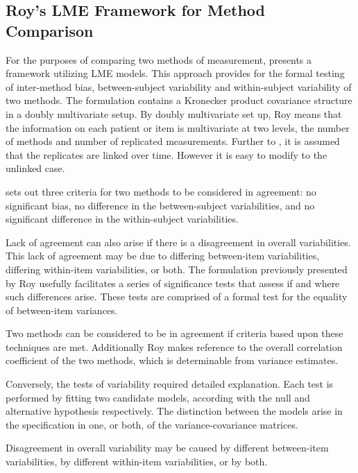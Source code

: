 \documentclass[12pt, a4paper]{report}
\theoremstyle{plain}
\theoremstyle{definition}
\theoremstyle{remark}
\begin{document}
\subsection*{Roy's LME Framework for Method Comparison }
For the purposes of comparing two methods of measurement, \citet{ARoy2009} presents a framework utilizing LME models. This approach provides for the formal testing of inter-method bias, between-subject variability and within-subject variability of two methods. The formulation contains a Kronecker product covariance structure in a doubly multivariate setup. By doubly multivariate set up, Roy means that the information on each patient or item is multivariate at two levels, the number of methods and number of replicated measurements. Further to \citet{lam}, it is assumed that the replicates are linked over time. However it is easy to modify to the unlinked case.

\citet{Barnhart} sets out three criteria for two methods to be considered in agreement: no significant bias, no difference in the between-subject variabilities, and no significant difference in the within-subject variabilities. 
	
Lack of agreement can also arise if there is a disagreement in overall variabilities. This lack of agreement may be due to differing between-item variabilities, differing within-item variabilities, or both. The formulation previously presented by Roy usefully facilitates a series of significance tests that assess if and where such differences arise. These tests are comprised of a formal test for the equality of between-item variances. 
	
Two methods can be considered to be in agreement if criteria based upon these techniques are met. Additionally Roy makes reference to the overall correlation coefficient of the two methods, which is determinable from variance estimates.

Conversely, the tests of variability required detailed explanation. Each test is performed by fitting two candidate models, according with the null and alternative hypothesis respectively. The distinction between the models arise in the specification in one, or both, of the variance-covariance matrices. %

Disagreement in overall variability may be caused by different between-item variabilities, by different within-item variabilities, or by both. 
\end{document}
